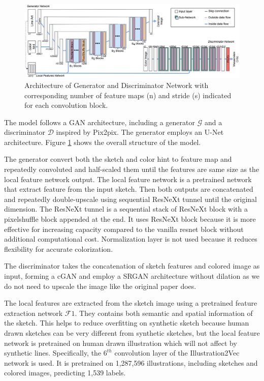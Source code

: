 \begin{figure}
    \centering
    \includegraphics[width=1.0\textwidth]{images/colorization/alacgan_arch.png}
    \caption{Architecture of Generator and Discriminator Network with corresponding number of feature maps (n) and stride (s) indicated for each convolution block.} 
    \label{fig:alacgan_arch}
\end{figure}

The model follows a GAN architecture, including a generator $\mathcal{G}$ and a discriminator $\mathcal{D}$ inspired by Pix2pix. The generator employs an U-Net\cite{ronnebergerUNetConvolutionalNetworks2015} architecture. Figure \ref{fig:alacgan_arch} shows the overall structure of the model.


The generator convert both the sketch and color hint to feature map and repeatedly convoluted and half-scaled them until the features are same size as the local feature network output. The local feature network is a pretrained network that extract feature from the input sketch. Then both outputs are concatenated and repeatedly double-upscale using sequential ResNeXt tunnel until the original dimension. The ResNeXt tunnel is a sequential stack of ResNeXt block\cite{xieAggregatedResidualTransformations2017a} with a pixelshuffle block\cite{shiRealTimeSingleImage2016} appended at the end. It uses ResNeXt block because it is more effective for increasing capacity compared to the vanilla resnet block without additional computational cost. Normalization layer is not used because it reduces flexibility for accurate colorization\cite{nahDeepMultiscaleConvolutional2018}.

The discriminator takes the concatenation of sketch features and colored image as input, forming a cGAN\cite{mirzaConditionalGenerativeAdversarial2014} and employ a SRGAN\cite{ledigPhotoRealisticSingleImage2017} architecture without dilation as we do not need to upscale the image like the original paper does.

The local features are extracted from the sketch image using a pretrained feature extraction network $\mathcal{F}1$. They contains both semantic and spatial information of the sketch. This helps to reduce overfitting on synthetic sketch because human drawn sketches can be very different from synthetic sketches, but the local feature network is pretrained on human drawn illustration which will not affect by synthetic lines. Specifically, the $6^{th}$ convolution layer of the Illustration2Vec\cite{saitoIllustration2VecSemanticVector2015} network is used. It is pretrained on 1,287,596 illustrations, including sketches and colored images, predicting 1,539 labels.

